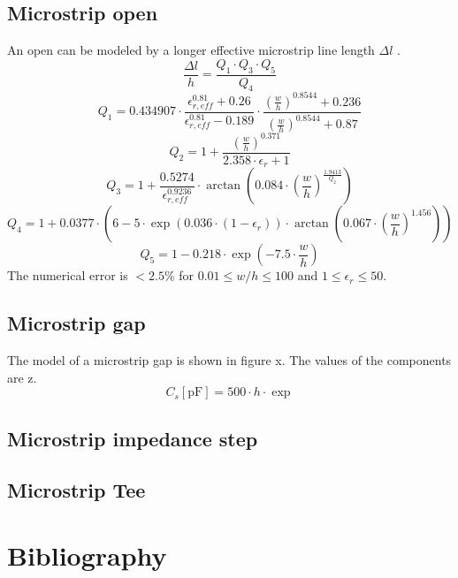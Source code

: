 \documentclass[10pt]{report}
\begin{document}
\section{Microstrip open}
An open can be modeled by a longer effective microstrip line
length $\Delta l$ \cite{Kirschning7}.
\begin{equation}
\frac{\Delta l}{h} = \frac{Q_1\cdot Q_3\cdot Q_5}{Q_4}
\end{equation}
\begin{equation}
Q_1 = 0.434907\cdot \frac{\epsilon_{r,eff}^{0.81}+0.26}{\epsilon_{r,eff}^{0.81}-0.189}\cdot
      \frac{\left( \frac{w}{h} \right)^{0.8544} + 0.236}{\left( \frac{w}{h} \right)^{0.8544} + 0.87}
\end{equation}
\begin{equation}
Q_2 = 1 + \frac{\left( \frac{w}{h} \right) ^{0.371}}{2.358\cdot \epsilon_r + 1}
\end{equation}
\begin{equation}
Q_3 = 1 + \frac{0.5274}{\epsilon_{r,eff}^{0.9236}} \cdot
      \arctan\left( 0.084\cdot\left( \frac{w}{h} \right) ^\frac{1.9413}{Q_2} \right)
\end{equation}
\begin{equation}
Q_4 = 1 + 0.0377\cdot \left( 6-5\cdot\exp(0.036\cdot(1-\epsilon_r))\cdot
      \arctan\left( 0.067\cdot\left(\frac{w}{h}\right)^{1.456} \right) \right)
\end{equation}
\begin{equation}
Q_5 = 1 - 0.218\cdot \exp\left( -7.5\cdot\frac{w}{h} \right)
\end{equation}
The numerical error is $<2.5$\% for $0.01\le w/h \le 100$ and $1\le\epsilon_r\le 50$.


\section{Microstrip gap}
The model of a microstrip gap is shown in figure x. The values of the
components are z.
\begin{equation}
C_s[\text{pF}] = 500\cdot h\cdot\exp
\end{equation}



\section{Microstrip impedance step}
\section{Microstrip Tee}



\chapter*{Bibliography}
\def\chapter*{}%
\def\section*{}%
\renewcommand{\bibname}{}



\nocite{*}
\end{document}
